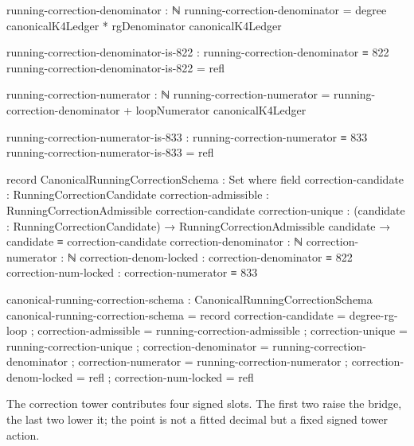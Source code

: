 \documentclass[11pt]{article}
\begin{document}
\begin{code}
running-correction-denominator : ℕ
running-correction-denominator =
  degree canonicalK4Ledger * rgDenominator canonicalK4Ledger

running-correction-denominator-is-822 :
  running-correction-denominator ≡ 822
running-correction-denominator-is-822 = refl

running-correction-numerator : ℕ
running-correction-numerator =
  running-correction-denominator + loopNumerator canonicalK4Ledger

running-correction-numerator-is-833 :
  running-correction-numerator ≡ 833
running-correction-numerator-is-833 = refl

record CanonicalRunningCorrectionSchema : Set where
  field
    correction-candidate     : RunningCorrectionCandidate
    correction-admissible    : RunningCorrectionAdmissible correction-candidate
    correction-unique        :
      (candidate : RunningCorrectionCandidate) →
      RunningCorrectionAdmissible candidate →
      candidate ≡ correction-candidate
    correction-denominator   : ℕ
    correction-numerator     : ℕ
    correction-denom-locked  : correction-denominator ≡ 822
    correction-num-locked    : correction-numerator ≡ 833

canonical-running-correction-schema : CanonicalRunningCorrectionSchema
canonical-running-correction-schema = record
  { correction-candidate    = degree-rg-loop
  ; correction-admissible   = running-correction-admissible
  ; correction-unique       = running-correction-unique
  ; correction-denominator  = running-correction-denominator
  ; correction-numerator    = running-correction-numerator
  ; correction-denom-locked = refl
  ; correction-num-locked   = refl
  }
\end{code}

The correction tower contributes four signed slots.  The first two raise the
bridge, the last two lower it; the point is not a fitted decimal but a fixed
signed tower action.
\end{document}
